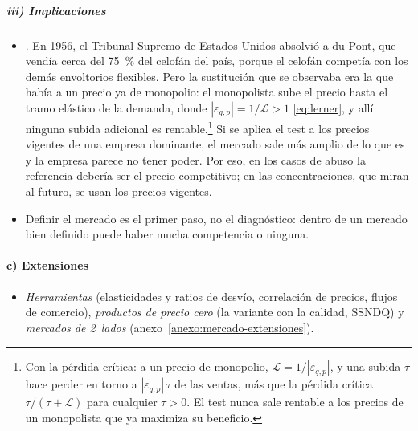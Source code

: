 \documentclass[11pt]{article}
\begin{document}
\begin{infografia}[H]
\centering
\caption{Test del monopolista hipotético: el mercado candidato se amplía hasta que la subida es rentable}\label{figu:ssnip}
\end{infografia}

\subparagraph{iii) Implicaciones}

\begin{itemize}
\item {}. En 1956, el Tribunal Supremo de Estados Unidos absolvió a du Pont, que vendía cerca del 75~\% del celofán del país, porque el celofán competía con los demás envoltorios flexibles\nocite{SupremeCourt1956DuPont}. Pero la sustitución que se observaba era la que había a un precio ya de monopolio: el monopolista sube el precio hasta el tramo elástico de la demanda, donde $|\varepsilon_{q,p}|=1/\mathcal{L}>1$ \eqref{eq:lerner}, y allí ninguna subida adicional es rentable.\footnote{Con la pérdida crítica: a un precio de monopolio, $\mathcal{L}=1/|\varepsilon_{q,p}|$, y una subida $\tau$ hace perder en torno a $|\varepsilon_{q,p}|\,\tau$ de las ventas, más que la pérdida crítica $\tau/(\tau+\mathcal{L})$ para cualquier $\tau>0$. El test nunca sale rentable a los precios de un monopolista que ya maximiza su beneficio.} Si se aplica el test a los precios vigentes de una empresa dominante, el mercado sale más amplio de lo que es y la empresa parece no tener poder\nocite{CE2024DefinicionMercado}. Por eso, en los casos de abuso la referencia debería ser el precio competitivo; en las concentraciones, que miran al futuro, se usan los precios vigentes.
\item Definir el mercado es el primer paso, no el diagnóstico: dentro de un mercado bien definido puede haber mucha competencia o ninguna.
\end{itemize}

\paragraph{c) Extensiones}

\begin{itemize}
\item \emph{Herramientas} (elasticidades y ratios de desvío, correlación de precios, flujos de comercio), \emph{productos de precio cero} (la variante con la calidad, SSNDQ) y \emph{mercados de 2~lados} (anexo~\ref{anexo:mercado-extensiones}).
\end{itemize}
\end{document}
